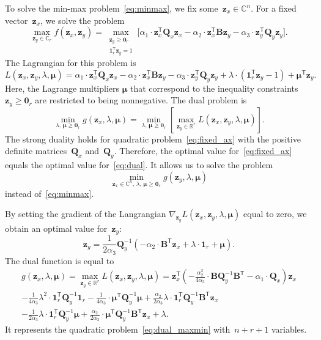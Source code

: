 \documentclass[preprint,12pt]{elsarticle}
\theoremstyle{definition}
\newcommand{\bz}{\mathbf{z}}
\newcommand{\bB}{\mathbf{B}}
\newcommand{\bQ}{\mathbf{Q}}
\newcommand{\bbR}{\mathbb{R}}
\newcommand{\T}{\mathsf{T}}
\newcommand{\bmu}{\boldsymbol{\mu}}
\newcommand{\bOne}{\boldsymbol{1}}
\newcommand{\bZero}{\boldsymbol{0}}
\begin{document}
To solve the min-max problem~\eqref{eq:minmax}, we fix some~$\bz_x \in \mathbb{C}^n$. For a fixed vector~$\bz_x$, we solve the problem
\begin{equation}
\max_{\bz_y \in \mathbb{C}_r} f(\bz_x, \bz_y) = \max_{\substack{\bz_y \geq \bZero_r \\ \bOne_r^{\T}\bz_y=1}} \bigl[\alpha_1 \cdot \bz_x^{\T} \bQ_x \bz_x - \alpha_2 \cdot \bz_x^{\T} \bB \bz_y - \alpha_3 \cdot \bz_y^{\T} \bQ_y \bz_y \bigr].
\label{eq:fixed_ax}
\end{equation}
The Lagrangian for this problem is
\begin{equation*}
L(\bz_x, \bz_y, \lambda, \bmu) = \alpha_1 \cdot \bz_x^{\T} \bQ_x \bz_x - \alpha_2 \cdot \bz_x^{\T} \bB \bz_y - \alpha_3 \cdot \bz_y^{\T} \bQ_y \bz_y + \lambda \cdot  (\bOne_r^{\T} \bz_y - 1) + \bmu^{\T} \bz_y.
\end{equation*}
Here, the Lagrange multipliers $\bmu$ that correspond to the inequality constraints $\bz_y \geq \bZero_r$ are restricted to being nonnegative.
The dual problem is
\begin{equation}
\min_{\lambda, \, \bmu \geq \bZero_r} g(\bz_x, \lambda, \bmu) = \min_{\lambda, \, \bmu \geq \bZero_r}  \left[\max_{\bz_y \in \bbR^r} L(\bz_x, \bz_y, \lambda, \bmu) \right].
\label{eq:dual}
\end{equation}
The strong duality holds for quadratic problem~\eqref{eq:fixed_ax} with the positive definite matrices~$\bQ_x$ and~$\bQ_y$. Therefore, the optimal value for~\eqref{eq:fixed_ax} equals the optimal value for~\eqref{eq:dual}. It allows us to solve the problem
\begin{equation}
\min_{\bz_x \in \mathbb{C}^n, \, \lambda, \, \bmu \geq \bZero_r} g(\bz_y, \lambda, \bmu)
\label{eq:dual_maxmin}
\end{equation}
instead of~\eqref{eq:minmax}.

By setting the gradient of the Langrangian $\nabla_{\bz_y} L(\bz_x, \bz_y, \lambda, \bmu)$ equal to zero, we obtain an optimal value for~$\bz_y$:
\begin{equation}
\bz_y = \frac{1}{2\alpha_3} \bQ_y^{-1} \left( - \alpha_2 \cdot \bB^{\T} \bz_x +\lambda \cdot \bOne_r + \bmu \right).
\label{eq:ax}
\end{equation}
The dual function is equal to
\begin{multline}
g(\bz_x, \lambda, \bmu)
= \max_{\bz_y \in \bbR^r} L(\bz_x, \bz_y, \lambda, \bmu) =
\bz_x^{\T} \left( - \frac{\alpha_2^2}{4\alpha_3} \cdot \bB \bQ_y^{-1} \bB^{\T} - \alpha_1 \cdot \bQ_x\right) \bz_x \\ - \frac{1}{4 \alpha_3} \lambda^2 \cdot \bOne_r^{\T} \bQ_y^{-1} \bOne_r - \frac{1}{4 \alpha_3} \cdot \bmu^{\T} \bQ_y^{-1} \bmu + \frac{\alpha_2}{2 \alpha_3} \lambda \cdot \bOne_r^{\T} \bQ_y^{-1} \bB^{\T} \bz_x \\ - \frac{1}{2 \alpha_3} \lambda \cdot \bOne_r^{\T} \bQ_y^{-1} \bmu + \frac{\alpha_2}{2 \alpha_3} \cdot \bmu^{\T} \bQ_y^{-1} \bB^{\T} \bz_x + \lambda.
\label{eq:dual_quadratic_form}
\end{multline}
It represents the quadratic problem~\eqref{eq:dual_maxmin} with~$n + r + 1$ variables.
\end{document}
